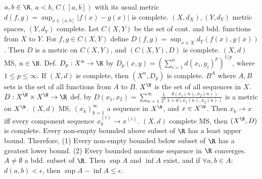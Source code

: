  $a,b \in \R$, $a < b$, $C([a,b])$ with its usual metric
$d(f,g) = \sup_{x \in [a,b]} |f(x) - g(x)|$ is complete.
 $(X,d_X), (Y, d_Y)$ metric spaces, $(Y, d_Y)$ complete.
Let $C(X,Y)$ be the set of cont. and bdd. functions from $X$ to $Y$.
For $f,g \in C(X,Y)$ define $D(f,g) = \sup_{x \in X} d_Y(f(x), g(x))$.
Then $D$ is a metric on $C(X,Y)$, and $(C(X,Y), D)$ is complete.
 $(X,d)$ MS, $n \in \N$. Def. $D_p: X^n \to \R$ by
$D_p(x,y) = \left( \sum_{i=1}^n d(x_i, y_i)^p \right)^{1/p}$, where $1 \leq p \leq \infty$.
 If $(X, d)$ is complete, then $(X^n, D_p)$ is complete.
 $B^A$ where $A, B$ sets is the set of all functions from $A$ to $B$.
 $X^\N$ is the set of all sequences in $X$.
 $D: X^\N \times X^\N \to \R$ def. by
$D(x_1, x_2) = \sum_{n=1}^\infty \frac{1}{2^n} \frac{d(x_1(n), x_2(n))}{1 + d(x_1(n), x_2(n))}$
is a metric on $X^\N$.
 $(X,d)$ MS, $(x_k)_{k=1}^\infty$ a sequence in $X^\N$, and $x \in X^\N$.
Then $x_k \to x$ iff every component sequence $x_k^{(i)} \to x^{(i)}$.
$(X, d)$ complete MS, then $(X^\N, D)$ is complete.
Every non-empty bounded above subset of $\R$ has a least upper bound.
Therefore,
(1) Every non-empty bounded below subset of $\R$ has a greatest lower bound.
(2) Every bounded monotone sequence in $\R$ converges.
 $A \neq \emptyset$ a bdd. subset of $\R$.
Then $\sup A$ and $\inf A$ exist, and
if $\forall a,b \in A$: $d(a,b) < \epsilon$, then $\sup A - \inf A \leq \epsilon$.
